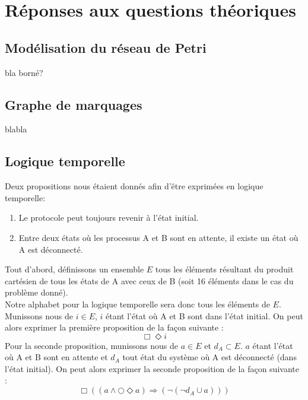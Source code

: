 \chapter{Réponses aux questions théoriques}\label{chap:Rep}
\section{Modélisation du réseau de Petri}

bla
borné?

\section{Graphe de marquages}

blabla

\section{Logique temporelle}

Deux propositions nous étaient donnés afin d'être exprimées en logique temporelle:
\begin{enumerate}
 \item Le protocole peut toujours revenir à l’état initial.
 \item Entre deux états où les processus A et B sont en attente, il existe un état où A est déconnecté.
\end{enumerate}
Tout d'abord, définissons un ensemble $E$ tous les éléments résultant du produit cartésien de tous les états de A avec ceux de B (soit 16 éléments dans le cas du problème donné).\\
Notre alphabet pour la logique temporelle sera donc tous les éléments de $E$.\\
Munissons nous de $i \in E$, $i$ étant l'état où A et B sont dans l'état initial. On peut alors exprimer la première proposition de la façon suivante :
\begin{equation}
 \Box\Diamond i
\end{equation}
Pour la seconde proposition, munissons nous de $a \in E$ et $d_A \subset E$. $a$ étant l'état où A et B sont en attente et $d_A$ tout état du système où A est déconnecté (dans l'état initial). On peut alors exprimer la seconde proposition de la façon suivante :
\begin{equation}
 \Box((a\wedge\bigcirc\Diamond a)\Longrightarrow(\neg(\neg d_A\cup a)))
\end{equation}



